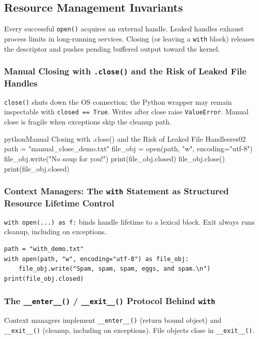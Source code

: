 \subsection{Resource Management Invariants}

Every successful \texttt{open()} acquires an external handle. Leaked handles exhaust process limits in long-running services. Closing (or leaving a \texttt{with} block) releases the descriptor and pushes pending buffered output toward the kernel.

\subsubsection{Manual Closing with \texttt{.close()} and the Risk of Leaked File Handles}

\texttt{close()} shuts down the OS connection; the Python wrapper may remain inspectable with \texttt{closed == True}. Writes after close raise \texttt{ValueError}. Manual close is fragile when exceptions skip the cleanup path.

\begin{codebox}[]{python}{Manual Closing with .close() and the Risk of Leaked File Handles}{res02}
path = "manual_close_demo.txt"
file_obj = open(path, "w", encoding="utf-8")
file_obj.write("No soup for you!\n")
print(file_obj.closed)
file_obj.close()
print(file_obj.closed)
\end{codebox}


\subsubsection{Context Managers: The \texttt{with} Statement as Structured Resource Lifetime Control}

\texttt{with open(...) as f:} binds handle lifetime to a lexical block. Exit always runs cleanup, including on exceptions.

\begin{verbatim}
path = "with_demo.txt"
with open(path, "w", encoding="utf-8") as file_obj:
    file_obj.write("Spam, spam, spam, eggs, and spam.\n")
print(file_obj.closed)
\end{verbatim}

\subsubsection{The \texttt{\_\_enter\_\_()} / \texttt{\_\_exit\_\_()} Protocol Behind \texttt{with}}

Context managers implement \texttt{\_\_enter\_\_()} (return bound object) and \texttt{\_\_exit\_\_()} (cleanup, including on exceptions). File objects close in \texttt{\_\_exit\_\_()}.

